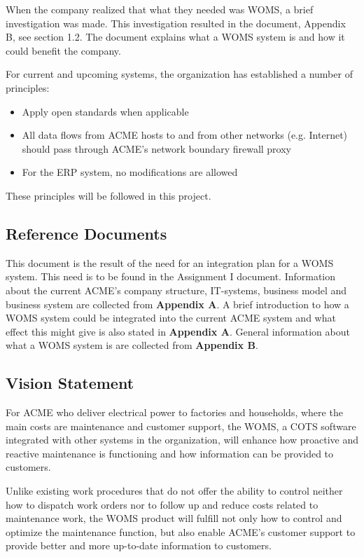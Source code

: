 \documentclass[a4paper]{article}
\begin{document}
When the company realized that what they needed was WOMS, a brief investigation was made. This investigation resulted in the document, Appendix B, see section 1.2. The document explains what a WOMS system is and how it could benefit the company.

For current and upcoming systems, the organization has established a number of principles:
\begin{itemize}
\item Apply open standards when applicable
\item All data flows from ACME hosts to and from other networks (e.g. Internet) should pass through ACME's network boundary firewall proxy
\item For the ERP system, no modifications are allowed
\end{itemize}

These principles will be followed in this project. 
 
\subsection{Reference Documents} 
\label{sub:reference_documents}

This document is the result of the need for an integration plan for a WOMS system. This need is to be found in the Assignment I document. Information about the current ACME's company structure, IT-systems, business model and business system are collected from \textbf{Appendix A}\cite{A}. A brief introduction to how a WOMS system could be integrated into the current ACME system and what effect this might give is also stated in \textbf{Appendix A}\cite{A}. General information about what a WOMS system is are collected from \textbf{Appendix B}\cite{B}.

\subsection{Vision Statement}
\label{sub:vision_statement}
For ACME who deliver electrical power to factories and households, where the main costs are maintenance and customer support, the WOMS, a COTS software integrated with other systems in the organization, will enhance how proactive and reactive maintenance is functioning and how information can be provided to customers. 

Unlike existing work procedures that do not offer the ability to control neither how to dispatch work orders nor to follow up and reduce costs related to maintenance work, the WOMS product will fulfill not only how to control and optimize the maintenance function, but also enable ACME's customer support to provide better and more up-to-date information to customers. 
\end{document}
